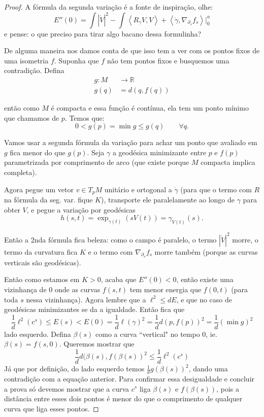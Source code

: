 \documentclass{book}
\begin{document}
\begin{proof}
       A fórmula da segunda variação é a
       fonte de inspiração, olhe:
$$
E''(0)=\int |\dot V|^2-\int\left\langle{}R_ {\dot
\gamma}V,V\right\rangle{}+\left\langle{}\dot\gamma,
\nabla_{\partial_s}f_s\right\rangle{}|_{0}^a
$$
e pense: o que preciso para tirar algo bacano
dessa formulinha?

De alguma maneira nos damos conta de que isso
tem a ver com os pontos fixos de
uma isometria $f$. Suponha que $f$ não tem
pontos fixos e busquemos uma
contradição. Defina
$$
\begin{aligned}
g: M &\longrightarrow \mathbb{R} \\
g(q) &=d(q,f(q))
\end{aligned}
$$

então como $M$ é compacta e essa função é
contínua, ela tem um ponto mínimo que
chamamos de $p$. Temos que:
$$
0<g(p)=\operatorname{min}g\leq g(q)\qquad
\forall q.
$$

Vamos usar a segunda fórmula da variação para
achar um ponto que avaliado em $g$
fica menor do que $g(p)$. Seja $\gamma$ a
geodésica minimizante entre $p$ e
$f(p)$ parametrizada por comprimento de arco
(que existe porque $M$ compacta
implica completa).

Agora pegue um vetor $v \in T_pM$ unitário e
ortogonal a $\dot \gamma$ (para que
o termo com $R$ na fórmula da seg. var. fique
$K$), transporte ele paralelamente
ao longo de $\gamma$ para obter $V$, e pegue
a variação por geodésicas
\[h(s,t)=\operatorname{exp}_{\gamma(t)}(sV(t)
)=\gamma_{V(t)}(s).\]

Então a 2nda fórmula fica beleza: como o
campo é paralelo, o termo $|\dot V|^2$
morre, o termo da curvatura fica $K$ e o
termo com $\nabla_{\partial_s}f_s$
morre também (porque as curvas verticais são
geodésicas).

Então como estamos em $K>0$, acaba que
$E''(0)<0$, então existe uma vizinhança
de $0$  onde as curvas $f(s,t)$ tem menor
energia que $f(0,t)$ (para toda $s$
nessa  vizinhança). Agora lembre que a
$\ell^2 \leq dE$, e que no caso de
geodésicas minimizantes se da a igualdade.
Então fica que
$$
\frac{1}{d}\ell^2(c^s)\leq
E(s)<E(0)=\frac{1}{d}\ell(\gamma)^2=\frac{1}
{d}d(p,f(p))^2
=\frac{1}{d}(\operatorname{min}g)^2
$$
lado esquerdo. Defina $\beta(s)$ como a curva
``vertical" no tempo 0, ie.
$\beta(s)=f(s,0)$. Queremos mostrar que
$$
\frac{1}{d}d(\beta(s),f(\beta(s))^2\leq
\frac{1}{d}\ell^2(c^s)
$$
Já que por definição, do lado esquerdo temos
$\frac{1}{d}g(\beta(s))^2$, dando
uma contradição com a equação anterior. Para
confirmar essa desigualdade e
concluir a prova só devemos mostrar que a
curva $c^s$ liga $\beta(s)$ e
$f(\beta(s))$, pois a distância entre esses
dois pontos é menor do que o
comprimento de qualquer curva que liga esses
pontos.


\end{proof}
\end{document}
